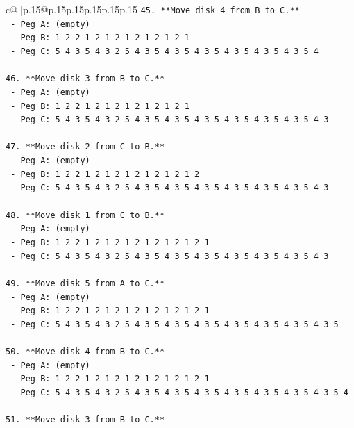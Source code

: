 \documentclass{article}
\begin{document}
{\begin{supertabular}{c@{$\;$}|p{.15\linewidth}@{}p{.15\linewidth}p{.15\linewidth}p{.15\linewidth}p{.15\linewidth}p{.15\linewidth}}
{{{\texttt{45. **Move disk 4 from B to C.**} \\
\texttt{    {-} Peg A: (empty)} \\
\texttt{    {-} Peg B: 1 2 2 1 2 1 2 1 2 1 2 1 2 1} \\
\texttt{    {-} Peg C: 5 4 3 5 4 3 2 5 4 3 5 4 3 5 4 3 5 4 3 5 4 3 5 4 3 5 4} \\
\\ 
\texttt{46. **Move disk 3 from B to C.**} \\
\texttt{    {-} Peg A: (empty)} \\
\texttt{    {-} Peg B: 1 2 2 1 2 1 2 1 2 1 2 1 2 1} \\
\texttt{    {-} Peg C: 5 4 3 5 4 3 2 5 4 3 5 4 3 5 4 3 5 4 3 5 4 3 5 4 3 5 4 3} \\
\\ 
\texttt{47. **Move disk 2 from C to B.**} \\
\texttt{    {-} Peg A: (empty)} \\
\texttt{    {-} Peg B: 1 2 2 1 2 1 2 1 2 1 2 1 2 1 2} \\
\texttt{    {-} Peg C: 5 4 3 5 4 3 2 5 4 3 5 4 3 5 4 3 5 4 3 5 4 3 5 4 3 5 4 3} \\
\\ 
\texttt{48. **Move disk 1 from C to B.**} \\
\texttt{    {-} Peg A: (empty)} \\
\texttt{    {-} Peg B: 1 2 2 1 2 1 2 1 2 1 2 1 2 1 2 1} \\
\texttt{    {-} Peg C: 5 4 3 5 4 3 2 5 4 3 5 4 3 5 4 3 5 4 3 5 4 3 5 4 3 5 4 3} \\
\\ 
\texttt{49. **Move disk 5 from A to C.**} \\
\texttt{    {-} Peg A: (empty)} \\
\texttt{    {-} Peg B: 1 2 2 1 2 1 2 1 2 1 2 1 2 1 2 1} \\
\texttt{    {-} Peg C: 5 4 3 5 4 3 2 5 4 3 5 4 3 5 4 3 5 4 3 5 4 3 5 4 3 5 4 3 5} \\
\\ 
\texttt{50. **Move disk 4 from B to C.**} \\
\texttt{    {-} Peg A: (empty)} \\
\texttt{    {-} Peg B: 1 2 2 1 2 1 2 1 2 1 2 1 2 1 2 1} \\
\texttt{    {-} Peg C: 5 4 3 5 4 3 2 5 4 3 5 4 3 5 4 3 5 4 3 5 4 3 5 4 3 5 4 3 5 4} \\
\\ 
\texttt{51. **Move disk 3 from B to C.**} \\
}}}
\end{supertabular}}
\end{document}
